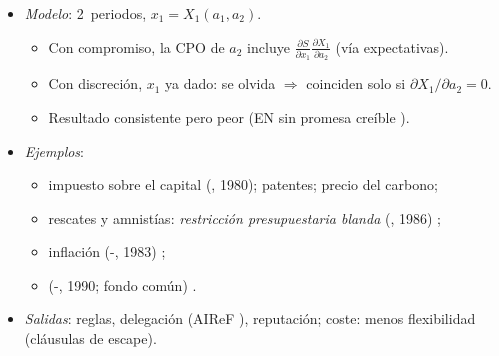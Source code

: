 \documentclass{article}
\begin{document}
\begin{columnas}
\begin{itemize}
  \begin{itemize}
  \item «\emph{Antes de meter, prometo; y una vez metido, olvido lo prometido}».
  \item Zonas inundables: prometer no hacer la mota; con las casas hechas, se hace.
  \end{itemize}
\item \emph{Modelo}: 2~periodos, $x_1=X_1(a_1,a_2)$.
  \begin{itemize}
  \item Con compromiso, la CPO de $a_2$ incluye $\frac{\partial S}{\partial x_1}\frac{\partial X_1}{\partial a_2}$ (vía expectativas).
  \item Con discreción, $x_1$ ya dado: se olvida $\Rightarrow$ coinciden solo si $\partial X_1/\partial a_2=0$.
  \item Resultado consistente pero peor (EN sin promesa creíble ).
  \end{itemize}
\item \emph{Ejemplos}:
  \begin{itemize}
  \item impuesto sobre el capital (, 1980); patentes; precio del carbono;
  \item rescates y amnistías: \emph{restricción presupuestaria blanda} (, 1986) ;
  \item inflación (-, 1983) ;
  \item {} (-, 1990; fondo común) .
  \end{itemize}
\item \emph{Salidas}: reglas, delegación (AIReF ), reputación; coste: menos flexibilidad (cláusulas de escape).
\end{itemize}


\end{columnas}
\end{document}
